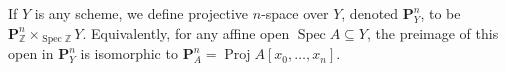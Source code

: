 If $Y$ is any scheme, we define projective $n$-space over $Y$, denoted $\mathbf{P}_Y^n$, to be $\mathbf{P}_{\mathbb{Z}}^n \times_{\operatorname{Spec} \mathbb{Z}} Y$. Equivalently, for any affine open $\operatorname{Spec} A \subseteq Y$, the preimage of this open in $\mathbf{P}_Y^n$ is isomorphic to $\mathbf{P}_A^n = \operatorname{Proj} A[x_0, \ldots, x_n]$.

